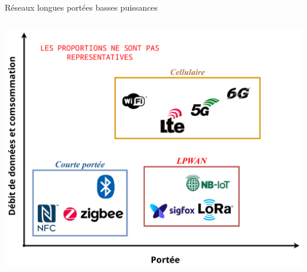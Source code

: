 \documentclass[../main.tex]{subfiles}
\begin{document}
\begin{frame}{Réseaux longues portées basses puissances}


  \begin{columns}
    \begin{column}{.5\linewidth} \centering
      \includegraphics[width=\linewidth, height=.65\textheight, keepaspectratio=true]{figures/drawiopdf/lpwan_and_co}
    \end{column}


\end{columns}
\end{frame}
\end{document}
